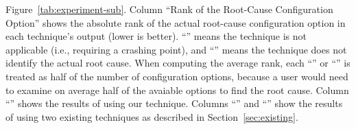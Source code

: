 \begin{figure*}[t]
{{Figure~\ref{tab:experiment-sub}. 
Column ``Rank of the Root-Cause Configuration Option'' shows the
absolute rank of the actual root-cause
configuration option in each technique's output (lower is better).
``\x'' means the technique is not applicable (i.e., requiring a crashing
point), and ``\n'' means the technique does not identify the actual root cause.
When computing the average rank, each ``\x'' or ``\n'' is treated as
half of the number of configuration options, because a user would need to examine
on average half of the avaiable options to find the root cause.
Column ``\ourtool'' shows the results
of using our technique. Columns ``\prevtool'' and ``\conftool'' show
the results of using two existing techniques as described in Section~\ref{sec:existing}.
}
}
\end{figure*}
